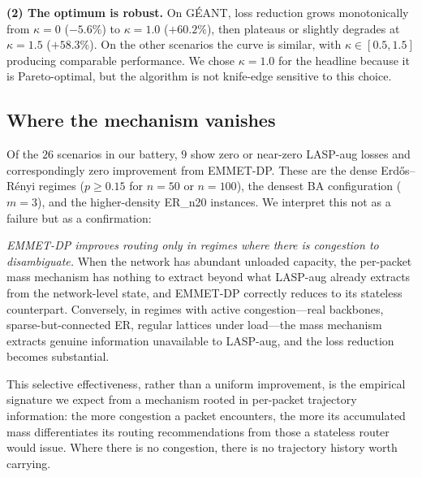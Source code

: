 \textbf{(2) The optimum is robust.} On GÉANT, loss reduction grows
monotonically from $\kappa=0$ ($-5.6\%$) to $\kappa=1.0$
($+60.2\%$), then plateaus or slightly degrades at $\kappa=1.5$
($+58.3\%$). On the other scenarios the curve is similar, with
$\kappa\in[0.5, 1.5]$ producing comparable performance. We
chose $\kappa=1.0$ for the headline because it is Pareto-optimal,
but the algorithm is not knife-edge sensitive to this choice.

\subsection{Where the mechanism vanishes}
\label{subsec:vanishing}

Of the $26$ scenarios in our battery, $9$ show zero or near-zero
LASP-aug losses and correspondingly zero improvement from
EMMET-DP. These are the dense Erd\H{o}s--R\'enyi regimes
($p \ge 0.15$ for $n=50$ or $n=100$), the densest BA configuration
($m=3$), and the higher-density ER\_n20 instances. We interpret
this not as a failure but as a confirmation:

\textit{EMMET-DP improves routing only in regimes where there is
congestion to disambiguate.} When the network has abundant
unloaded capacity, the per-packet mass mechanism has nothing to
extract beyond what LASP-aug already extracts from the
network-level state, and EMMET-DP correctly reduces to its
stateless counterpart. Conversely, in regimes with active
congestion---real backbones, sparse-but-connected ER, regular
lattices under load---the mass mechanism extracts genuine
information unavailable to LASP-aug, and the loss reduction
becomes substantial.

This selective effectiveness, rather than a uniform improvement,
is the empirical signature we expect from a mechanism rooted in
per-packet trajectory information: the more congestion a packet
encounters, the more its accumulated mass differentiates its
routing recommendations from those a stateless router would
issue. Where there is no congestion, there is no trajectory
history worth carrying.
